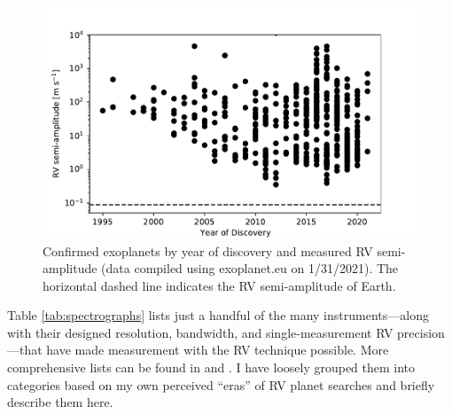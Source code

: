 \begin{figure}
    \centering
    \includegraphics{figures-1/rv-exoplanets.pdf}
    \caption[Radial-velocity Technique Timeline -- Exoplanet discoveries by year and semi-amplitude]{Confirmed exoplanets by year of discovery and measured RV semi-amplitude (data compiled using exoplanet.eu on 1/31/2021). The horizontal dashed line indicates the RV semi-amplitude of Earth.}
    \label{fig:rv-exoplanets}
\end{figure}

Table \ref{tab:spectrographs} lists just a handful of the many instruments---along with their designed resolution, bandwidth, and single-measurement RV precision---that have made measurement with the RV technique possible. More comprehensive lists can be found in \citet{fischer_state_2016} and \citet{wright_third_2017}. I have loosely grouped them into categories based on my own perceived ``eras'' of RV planet searches and briefly describe them here.

